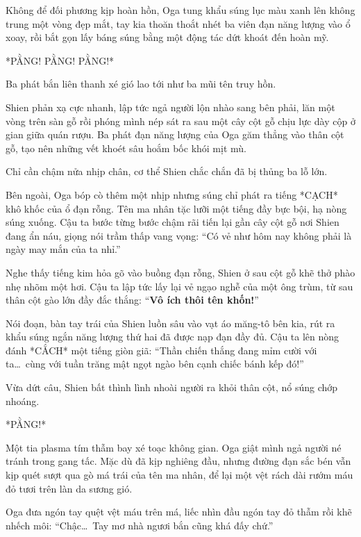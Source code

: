 \documentclass[../main.tex]{subfiles}
\begin{document}
Không để đối phương kịp hoàn hồn, Oga tung khẩu súng lục màu xanh lên không trung một vòng đẹp mắt, tay kia thoăn thoắt nhét ba viên đạn năng lượng vào ổ xoay, rồi bắt gọn lấy báng súng bằng một động tác dứt khoát đến hoàn mỹ.

*PẰNG! PẰNG! PẰNG!*

Ba phát bắn liên thanh xé gió lao tới như ba mũi tên truy hồn.

Shien phản xạ cực nhanh, lập tức ngả người lộn nhào sang bên phải, lăn một vòng trên sàn gỗ rồi phóng mình nép sát ra sau một cây cột gỗ chịu lực dày cộp ở gian giữa quán rượu. Ba phát đạn năng lượng của Oga găm thẳng vào thân cột gỗ, tạo nên những vết khoét sâu hoắm bốc khói mịt mù.

Chỉ cần chậm nửa nhịp chân, cơ thể Shien chắc chắn đã bị thủng ba lỗ lớn.

Bên ngoài, Oga bóp cò thêm một nhịp nhưng súng chỉ phát ra tiếng *CẠCH* khô khốc của ổ đạn rỗng. Tên ma nhân tặc lưỡi một tiếng đầy bực bội, hạ nòng súng xuống. Cậu ta bước từng bước chậm rãi tiến lại gần cây cột gỗ nơi Shien đang ẩn náu, giọng nói trầm thấp vang vọng: ``Có vẻ như hôm nay không phải là ngày may mắn của ta nhỉ.''

Nghe thấy tiếng kim hỏa gõ vào buồng đạn rỗng, Shien ở sau cột gỗ khẽ thở phào nhẹ nhõm một hơi. Cậu ta lập tức lấy lại vẻ ngạo nghễ của một ông trùm, từ sau thân cột gào lớn đầy đắc thắng: ``\textbf{Vô ích thôi tên khốn!}''

Nói đoạn, bàn tay trái của Shien luồn sâu vào vạt áo măng-tô bên kia, rút ra khẩu súng ngắn năng lượng thứ hai đã được nạp đạn đầy đủ. Cậu ta lên nòng đánh *CẮCH* một tiếng giòn giã: ``Thần chiến thắng đang mỉm cười với ta\dots\ cùng với tuần trăng mật ngọt ngào bên cạnh chiếc bánh kếp đó!''


Vừa dứt câu, Shien bất thình lình nhoài người ra khỏi thân cột, nổ súng chớp nhoáng.

*PẰNG!*

Một tia plasma tím thẫm bay xé toạc không gian. Oga giật mình ngả người né tránh trong gang tấc. Mặc dù đã kịp nghiêng đầu, nhưng đường đạn sắc bén vẫn kịp quét sượt qua gò má trái của tên ma nhân, để lại một vệt rách dài rướm máu đỏ tươi trên làn da sương gió.


Oga đưa ngón tay quệt vệt máu trên má, liếc nhìn đầu ngón tay đỏ thẫm rồi khẽ nhếch môi: ``Chậc\dots\ Tay mơ nhà ngươi bắn cũng khá đấy chứ.''
\end{document}
